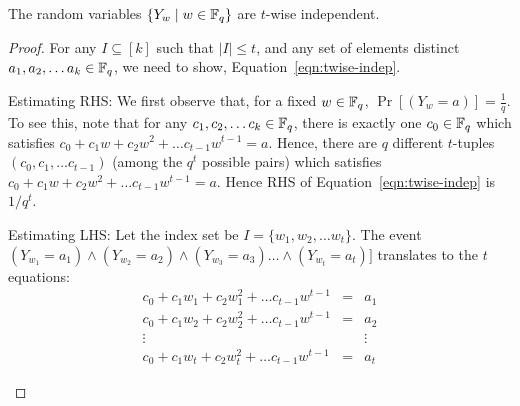\begin{claim}
The random variables $\{ Y_w \mid w \in {\mathbb{F}}_q\}$ are $t$-wise independent.
\end{claim}
\begin{proof}
For any $I \subseteq [k]$ such that $|I|\le t$, and any set of elements distinct $a_1, a_2, \ldots a_k \in {\mathbb{F}}_q$, we need to show, Equation~\ref{eqn:twise-indep}. 

\begin{description}
\item{\sf Estimating RHS:} 
We first observe that, for a fixed $w \in {\mathbb{F}}_q$, $\Pr\left[(Y_w = a)\right] = \frac{1}{q}$. To see this, note that for any $c_1, c_2, \ldots c_k \in {\mathbb{F}}_q$, there is exactly one $c_0 \in {\mathbb{F}}_q$ which satisfies $c_0+c_1w+c_2w^2+ \ldots c_{t-1}w^{t-1} = a$. Hence, there are $q$ different $t$-tuples $(c_0, c_1, \ldots c_{t-1})$ (among the $q^t$ possible pairs) which satisfies $c_0+c_1w+c_2w^2+ \ldots c_{t-1}w^{t-1} = a$. Hence RHS of Equation~\ref{eqn:twise-indep} is $1/q^t$.
\item{\sf Estimating LHS:}
Let the index set be $I = \{w_1, w_2, \ldots w_t\}$.
The event $(Y_{w_1} = a_1) \land (Y_{w_2} = a_2) \land (Y_{w_3} = a_3) \ldots \land (Y_{w_t} = a_t)]$ translates to the $t$
equations: 
\begin{eqnarray*}
c_0+c_1w_1+c_2w_1^2+ \ldots c_{t-1}w^{t-1} & = & a_1 \\
c_0+c_1w_2+c_2w_2^2+ \ldots c_{t-1}w^{t-1} & = & a_2 \\
\vdots & & \vdots \\
c_0+c_1w_t+c_2w_t^2+ \ldots c_{t-1}w^{t-1} & = & a_t
\end{eqnarray*}


\end{description}
\end{proof}
